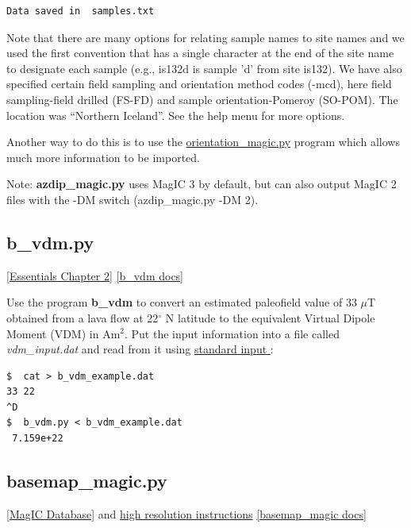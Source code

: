 \documentclass[11pt]{book}
\begin{document}
{{{\begin{verbatim}
Data saved in  samples.txt
\end{verbatim}

Note that there are many options for relating sample names to site names and we used the first convention that has a single character at the end of the site name to designate each sample (e.g., is132d is sample 'd' from site is132).   We have also specified certain field sampling and orientation method codes (-mcd), here field sampling-field drilled (FS-FD) and sample orientation-Pomeroy (SO-POM).  The location was ``Northern Iceland''.   See the help menu for more options.

Another way to do this is to use the \href{#orientation_magic.py}{orientation\_magic.py} program which allows much more information to be imported.

Note: {\bf azdip\_magic.py} uses MagIC 3 by default, but can also output MagIC 2 files with the -DM switch (azdip\_magic.py -DM 2).


\subsection{b\_vdm.py}
\href{http://earthref.org/MAGIC/books/Tauxe/Essentials/WebBook3ch2.html#Virtual_dipole_moment}{[Essentials Chapter 2]}
\href{https://github.com/PmagPy/PmagPy/blob/master/programs/b_vdm.py}{[b\_vdm docs]}

Use the program {\bf b\_vdm} to convert an estimated paleofield value of 33 $\mu$T obtained from a lava flow at 22$^{\circ}$ N latitude to the equivalent Virtual Dipole Moment (VDM) in Am$^2$.   Put the input information into a file called {\it vdm\_input.dat}  and read from it using  \href{#standard_IO}{standard input }:

\begin{verbatim}
$  cat > b_vdm_example.dat
33 22
^D
$  b_vdm.py < b_vdm_example.dat
 7.159e+22
\end{verbatim}


\subsection{basemap\_magic.py}
\label{ex:basemap_magic}
\href{#MagICDatabase}{[MagIC Database]} and   \href{#HighRes}{high resolution instructions}
\href{https://github.com/PmagPy/PmagPy/blob/master/programs/basemap_magic.py}{[basemap\_magic docs]}

}}}
\end{document}
